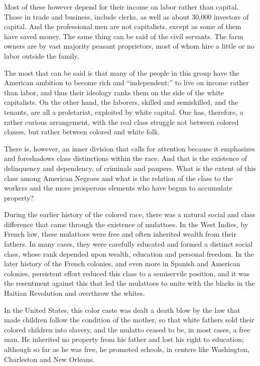 \documentclass[letterpaper,10pt,english]{jupyterBook}
\begin{document}
\sphinxAtStartPar
Most of these however depend for their income on labor rather than capital. Those in trade and business, include clerks, as well as about 30,000 investors of capital. And the professional men are not capitalists, except as some of them have saved money. The same thing can be said of the civil servants. The farm owners are by vast majority peasant proprietors, most of whom hire a little or no labor outside the family.

\sphinxAtStartPar
The most that can be said is that many of the people in this group have the American ambition to become rich and “independent;” to live on income rather than labor, and thus their ideology ranks them on the side of the white capitalists. On the other hand, the laborers, skilled and semi\sphinxhyphen{}skilled, and the tenants, are all a proletariat, exploited by white capital. One has, therefore, a rather curious arrangement, with the real class struggle not between colored classes, but rather between colored and white folk.

\sphinxAtStartPar
There is, however, an inner division that calls for attention because it emphasizes and foreshadows class distinctions within the race. And that is the existence of delinquency and dependency, of criminals and paupers. What is the extent of this class among American Negroes and what is the relation of the class to the workers and the more prosperous elements who have begun to accumulate property?

\sphinxAtStartPar
During the earlier history of the colored race, there was a natural social and class difference that came through the existence of mulattoes. In the West Indies, by French law, these mulattoes were free and often inherited wealth from their fathers. In many cases, they were carefully educated and formed a distinct social class, whose rank depended upon wealth, education and personal freedom. In the later history of the French colonies, and even more in Spanish and American colonies, persistent effort reduced this class to a semi\sphinxhyphen{}servile position, and it was the resentment against this that led the mulattoes to unite with the blacks in the Haitian Revolution and overthrow the whites.

\sphinxAtStartPar
In the United States, this color caste was dealt a death blow by the law that made children follow the condition of the mother, so that white fathers sold their colored children into slavery, and the mulatto ceased to be, in most cases, a free man. He inherited no property from his father and lost his right to education; although so far as he was free, he promoted schools, in centers like Washington, Charleston and New Orleans.
\end{document}
